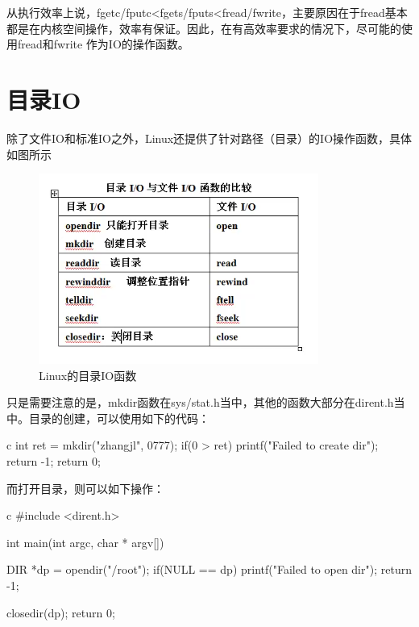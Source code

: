 从执行效率上说，fgetc/fputc<fgets/fputs<fread/fwrite，主要原因在于fread基本都是在内核空间操作，效率有保证。因此，在有高效率要求的情况下，尽可能的使用fread和fwrite
作为IO的操作函数。

\section{目录IO}
除了文件IO和标准IO之外，Linux还提供了针对路径（目录）的IO操作函数，具体如图所示
\begin{figure}[H]
  \centering
  \includegraphics[width=\linewidth]{dirio.png}
  \caption{Linux的目录IO函数}
  \label{fig:dirio}
\end{figure}

只是需要注意的是，mkdir函数在sys/stat.h当中，其他的函数大部分在dirent.h当中。目录的创建，可以使用如下的代码：
\begin{code-block}{c}
int ret = mkdir("zhangjl", 0777);
if(0 > ret)
{
        printf("Failed to create dir\n");
        return -1;
}
return 0;
\end{code-block}

而打开目录，则可以如下操作：
\begin{code-block}{c}
#include <dirent.h>

int main(int argc, char * argv[])
{
        DIR *dp = opendir("/root");
        if(NULL ==  dp)
        {
                printf("Failed to open dir\n");
                return -1;
        }

        closedir(dp);
        return 0;
}
\end{code-block}

